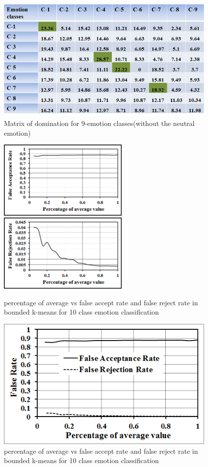 \begin{figure}
\centering
\includegraphics[width=4.25in,clip,keepaspectratio]{Chapters/figures/emotionMatrix}
\caption{Matrix of domination for 9-emotion classes(without the neutral emotion)}
\label{Optional 6}
\end{figure}


\begin{figure}
\centering
\includegraphics[width=2.5in,clip,keepaspectratio]{Chapters/figures/Emotion/10class/fA}
\includegraphics[width=2.5in,clip,keepaspectratio]{Chapters/figures/Emotion/10class/fR}
\caption{percentage of average vs false accept rate and false reject rate in bounded k-means for 10 class emotion classification}
\label{Optional 5}
\end{figure}

\begin{figure}
\centering
\includegraphics[width=4.25in,clip,keepaspectratio]{Chapters/figures/Emotion/10class/fAfR}
\caption{percentage of average vs false accept rate and false reject rate in bounded k-means for 10 class emotion classification}
\label{Optional 5}
\vskip -1cm
\end{figure}



